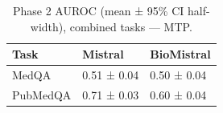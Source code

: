 \begin{table}
\caption{Phase 2 AUROC (mean ± 95\% CI half-width), combined tasks — MTP.}
\label{tab:phase2_auroc_all_mtp}
\begin{tabular}{lll}
\toprule
Task & Mistral & BioMistral \\
\midrule
MedQA & 0.51 ± 0.04 & 0.50 ± 0.04 \\
PubMedQA & 0.71 ± 0.03 & 0.60 ± 0.04 \\
\bottomrule
\end{tabular}
\end{table}

